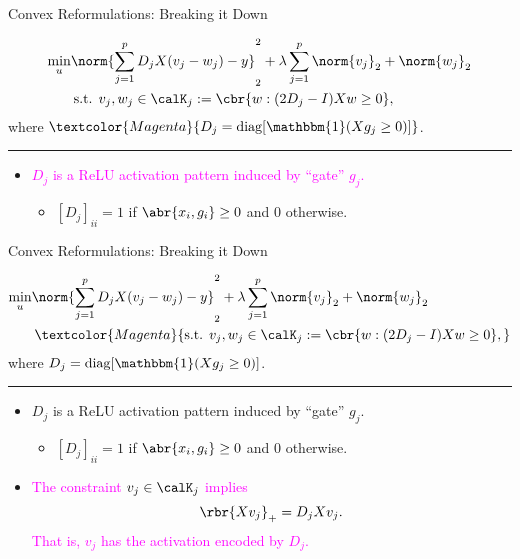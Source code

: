 \documentclass[usenames,dvipsnames,mathserif,notheorems]{beamer}
\newcommand{\horizontalrule}{
	{
			\vspace{-0.5em}
			\center \rule{\textwidth}{0.1em}
			\vspace{-0.2em}
		}
}
\newcommand{\purple}[1]{\textcolor{Magenta}{#1}}
\begin{document}
\begin{frame}{Convex Reformulations: Breaking it Down}

	\[
		\begin{aligned}
			\min_{u} & \norm{\sum_{j=1}^p D_j X (v_j - w_j) - y}_2^2 +
			\lambda \sum_{j=1}^p \norm{v_j}_2 + \norm{w_j}_2           \\
			         & \hspace{0.2em} \text{s.t. }
			v_j, w_j \in \calK_j := \cbr{w : (2D_j - I) X w \geq 0},
		\end{aligned}
	\]
	where \( \purple{D_j = \text{diag}[\mathbbm{1}(X g_j \geq 0)]} \).

	\horizontalrule

	\begin{itemize}
		\item \purple{\( D_j \) is a ReLU activation pattern induced by ``gate'' \( g_j \).}
		      \pause
		      \begin{itemize}
			      \item \([D_j]_{ii} = 1\) if \( \abr{x_i, g_i} \geq 0 \) and \( 0 \) otherwise.
		      \end{itemize}

	\end{itemize}
	\vspace{7.3em}
\end{frame}


\begin{frame}{Convex Reformulations: Breaking it Down}

	\[
		\begin{aligned}
			\min_{u} & \norm{\sum_{j=1}^p D_j X (v_j - w_j) - y}_2^2 +
			\lambda \sum_{j=1}^p \norm{v_j}_2 + \norm{w_j}_2           \\
			         & \hspace{0.2em} \purple{\text{s.t. }
				v_j, w_j \in \calK_j := \cbr{w : (2D_j - I) X w \geq 0},}
		\end{aligned}
	\]
	where \( D_j = \text{diag}[\mathbbm{1}(X g_j \geq 0)] \).

	\horizontalrule

	\begin{itemize}
		\item \( D_j \) is a ReLU activation pattern induced by ``gate'' \( g_j \).
		      \begin{itemize}
			      \item \([D_j]_{ii} = 1\) if \( \abr{x_i, g_i} \geq 0 \) and \( 0 \) otherwise.
		      \end{itemize}
		\item \purple{The constraint \( v_j \in \calK_j \) implies
			      \[
				      \rbr{X v_j}_+ = D_j X v_j.
			      \]
			      That is, \( v_j \) has the activation encoded by \( D_j \).
		      }
	\end{itemize}
\end{frame}
\end{document}
